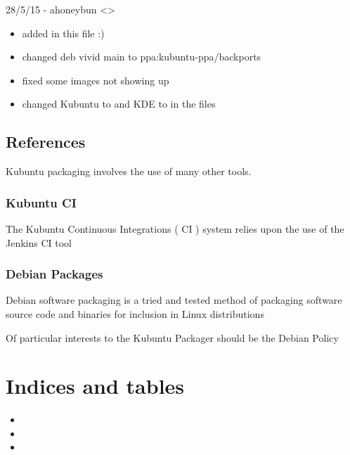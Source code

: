 \documentclass[letterpaper,10pt,english]{sphinxmanual}
\begin{document}
28/5/15 - ahoneybun \textless{}\textgreater{}
\begin{itemize}
\item {} 
added in this file :)

\item {} 
changed \sphinxquotedblleft{}deb  vivid main\sphinxquotedblright{} to \sphinxquotedblleft{}ppa:kubuntu-ppa/backports\sphinxquotedblright{}

\item {} 
fixed some images not showing up

\item {} 
changed Kubuntu to  and KDE to  in the files

\end{itemize}


\section{References}
\label{\detokenize{docs/appendix/references:references}}\label{\detokenize{docs/appendix/references::doc}}
Kubuntu packaging involves the use of many other tools.


\subsection{Kubuntu CI}
\label{\detokenize{docs/appendix/references:kubuntu-ci}}
The Kubuntu Continuous Integrations ( CI ) system relies upon the use of the Jenkins CI tool



\subsection{Debian Packages}
\label{\detokenize{docs/appendix/references:debian-packages}}
Debian software packaging is a tried and tested method of packaging software source code and binaries for inclusion in Linux distributions

Of particular interests to the Kubuntu Packager should be the Debian Policy



\chapter{Indices and tables}
\label{\detokenize{index:indices-and-tables}}\begin{itemize}
\item {} 

\item {} 

\item {} 

\end{itemize}



\renewcommand{\indexname}{Index}
\printindex
\end{document}
